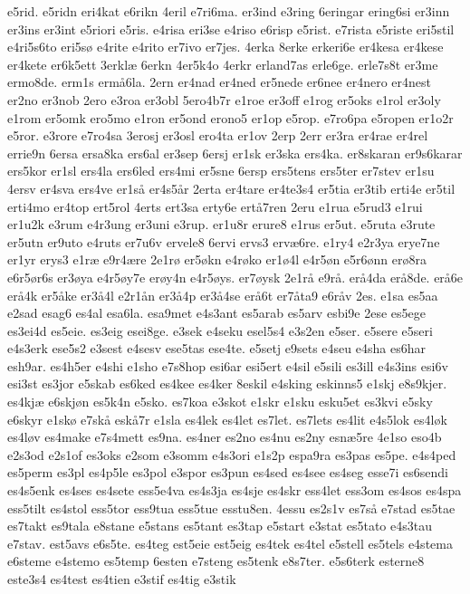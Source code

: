 {e5rid.
e5ridn
eri4kat
e6rikn
4eril
e7ri6ma.
er3ind
e3ring
6eringar
ering6si
er3inn
er3ins
er3int
e5riori
e5ris.
e4risa
eri3se
e4riso
e6risp
e5rist.
e7rista
e5riste
eri5stil
e4ri5s6to
eri5sø
e4rite
e4rito
er7ivo
er7jes.
4erka
8erke
erkeri6e
er4kesa
er4kese
er4kete
er6k5ett
3erklæ
6erkn
4er5k4o
4erkr
erland7as
erle6ge.
erle7s8t
er3me
ermo8de.
erm1s
ermå6la.
2ern
er4nad
er4ned
er5nede
er6nee
er4nero
er4nest
er2no
er3nob
2ero
e3roa
er3obl
5ero4b7r
e1roe
er3off
e1rog
er5oks
e1rol
er3oly
e1rom
er5omk
ero5mo
e1ron
er5ond
erono5
er1op
e5rop.
e7ro6pa
e5ropen
er1o2r
e5ror.
e3rore
e7ro4sa
3erosj
er3osl
ero4ta
er1ov
2erp
2err
er3ra
er4rae
er4rel
errie9n
6ersa
ersa8ka
ers6al
er3sep
6ersj
er1sk
er3ska
ers4ka.
er8skaran
er9s6karar
ers5kor
er1sl
ers4la
ers6led
ers4mi
er5sne
6ersp
ers5tens
ers5ter
er7stev
er1su
4ersv
er4sva
ers4ve
er1så
er4s5år
2erta
er4tare
er4te3s4
er5tia
er3tib
erti4e
er5til
erti4mo
er4top
ert5rol
4erts
ert3sa
erty6e
ertå7ren
2eru
e1rua
e5rud3
e1rui
er1u2k
e3rum
e4r3ung
er3uni
e3rup.
er1u8r
erure8
e1rus
er5ut.
e5ruta
e3rute
er5utn
er9uto
e4ruts
er7u6v
ervele8
6ervi
ervs3
ervæ6re.
e1ry4
e2r3ya
erye7ne
er1yr
erys3
e1ræ
e9r4ære
2e1rø
er5økn
e4røko
er1ø4l
e4r5øn
e5r6ønn
erø8ra
e6r5ør6s
er3øya
e4r5øy7e
erøy4n
e4r5øys.
er7øysk
2e1rå
e9rå.
erå4da
erå8de.
erå6e
erå4k
er5åke
er3å4l
e2r1ån
er3å4p
er3å4se
erå6t
er7åta9
e6råv
2es.
e1sa
es5aa
e2sad
esag6
es4al
esa6la.
esa9met
e4s3ant
es5arab
es5arv
esbi9e
2ese
es5ege
es3ei4d
es5eie.
es3eig
esei8ge.
e3sek
e4seku
esel5s4
e3s2en
e5ser.
e5sere
e5seri
e4s3erk
ese5s2
e3sest
e4sesv
ese5tas
ese4te.
e5setj
e9sets
e4seu
e4sha
es6har
esh9ar.
es4h5er
e4shi
e1sho
e7s8hop
esi6ar
esi5ert
e4sil
e5sili
es3ill
e4s3ins
esi6v
esi3st
es3jor
e5skab
es6ked
es4kee
es4ker
8eskil
e4sking
eskinns5
e1skj
e8s9kjer.
es4kjæ
e6skjøn
es5k4n
e5sko.
es7koa
e3skot
e1skr
e1sku
esku5et
es3kvi
e5sky
e6skyr
e1skø
e7skå
eskå7r
e1sla
es4lek
es4let
es7let.
es7lets
es4lit
e4s5lok
es4løk
es4løv
es4make
e7s4mett
es9na.
es4ner
es2no
es4nu
es2ny
esnæ5re
4e1so
eso4b
e2s3od
e2s1of
es3oks
e2som
e3somm
e4s3ori
e1s2p
espa9ra
es3pas
es5pe.
e4s4ped
es5perm
es3pl
es4p5le
es3pol
e3spor
es3pun
es4sed
es4see
es4seg
esse7i
es6sendi
es4s5enk
es4ses
es4sete
ess5e4va
es4s3ja
es4sje
es4skr
ess4let
ess3om
es4sos
es4spa
ess5tilt
es4stol
ess5tor
ess9tua
ess5tue
esstu8en.
4essu
es2s1v
es7så
e7stad
es5tae
es7takt
es9tala
e8stane
e5stans
es5tant
es3tap
e5start
e3stat
es5tato
e4s3tau
e7stav.
est5avs
e6s5te.
es4teg
est5eie
est5eig
es4tek
es4tel
e5stell
es5tels
e4stema
e6steme
e4stemo
es5temp
6esten
e7steng
es5tenk
e8s7ter.
e5s6terk
esterne8
este3s4
es4test
es4tien
e3stif
es4tig
e3stik
}
